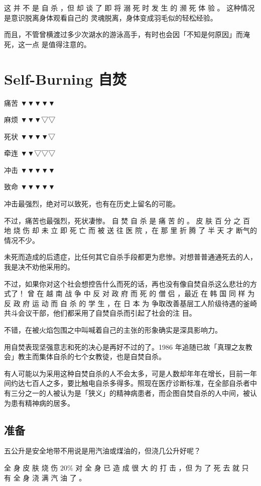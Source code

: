 \documentclass[UTF8]{ctexart}
\begin{document}
这 并 不 是 自 杀 ，但 却 谈 了 即 将 溺 死 时 发 生 的 濒 死 体 验 。
这种情况是意识脱离身体观看自己的 灵魂脱离，身体变成羽毛似的轻松经验。

而且，不管曾横渡过多少次湖水的游泳高手，有时也会因「不知是何原因」而淹死，这一点
是值得注意的。


\newpage

\section{Self-Burning 自焚}

痛苦 ▼▼▼▼▼

麻烦 ▼▼▼▽▽

死状 ▼▼▼▼▽

牵连 ▼▼▽▽▽

冲击 ▼▼▼▼▼

致命 ▼▼▼▼▼

冲击最强烈，绝对可以致死，也有在历史上留名的可能。

不过，痛苦也最强烈，死状凄惨。
自 焚 自 杀 是 痛 苦 的 。
皮 肤 百 分 之 百 地 烧 伤 却 未 立 即 死 亡 而 被 送 往 医 院 ，在 那 里 折 腾 了 半 天 才 断气的情况不少。

未死而造成的后遗症，比任何其它自杀手段都更为悲惨。对想普普通通死去的人，我是决不劝他采用的。

不过，如果你对这个社会想控告什么而死的话，再也没有像自焚自杀这么悲壮的方式了！
曾 在 越 南 战 争 中 反 对 政 府 而 死 的 僧 侣 ，最近 在 韩 国 同 样 为 反 政 府 运 动 而 自 杀 的 学 生 ，在 日 本 为 争取改善基层工人阶级待遇的釜崎共斗会议干部，他们都采用了自焚自杀而引起了社会的注 目。

不错，在被火焰包围之中叫喊着自己的主张的形象确实是深具影响力。

用自焚表现坚强意志和死的决心是再好不过的了。1986 年追随已故「真理之友教会」教主而集体自杀的七个女教徒，也是自焚自杀。

有人可能以为采用这种自焚自杀的人不会太多，可是人数却年年在增长，目前一年间约达七百人之多，要比触电自杀多得多。照现在医疗诊断标准，在全部自杀者中有三分之一的人被认为是「狭义」的精神病患者，而企图自焚自杀的人中间，被认为患有精神病的居多。

\subsection{准备}

五公升是安全地带不用说是用汽油或煤油的，但浇几公升好呢？ 

全 身 皮 肤 烧 伤 $20\%$ 对 全 身 已 造 成 很 大 的 打 击 ，但 为 了 死 去 就 只 有 全 身 浇 满 汽 油 了 。
\end{document}
